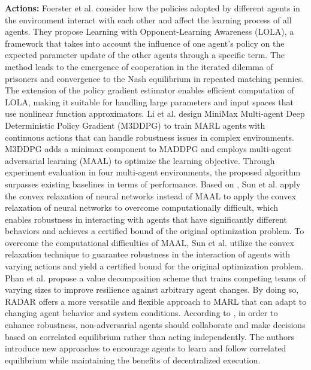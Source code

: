 \documentclass[acmsmall]{acmart}
\begin{document}
\textbf{Actions:} Foerster et al. \cite{foerster2017learning} consider how the policies adopted by different agents in the environment interact with each other and affect the learning process of all agents. They propose Learning with Opponent-Learning Awareness (LOLA), a framework that takes into account the influence of one agent's policy on the expected parameter update of the other agents through a specific term.
The method leads to the emergence of cooperation in the iterated dilemma of prisoners and convergence to the Nash equilibrium in repeated matching pennies. 
The extension of the policy gradient estimator enables efficient computation of LOLA, making it suitable for handling large parameters and input spaces that use nonlinear function approximators. 
Li et al. \cite{Li_Wu_Cui_Dong_Fang_Russell_2019} design MiniMax Multi-agent Deep Deterministic Policy Gradient (M3DDPG) to train MARL agents with continuous actions that can handle robustness issues in complex environments. M3DDPG  adds a minimax component to MADDPG \cite{maddpg} and employs multi-agent adversarial learning (MAAL) to optimize the learning objective. 
Through experiment evaluation in four multi-agent environments, the proposed algorithm surpasses existing baselines in terms of performance.
Based on \cite{Li_Wu_Cui_Dong_Fang_Russell_2019}, Sun et al. \cite{9812321} apply the convex relaxation of neural networks instead of MAAL to apply the convex relaxation of neural networks to overcome computationally difficult,  which enables robustness in interacting with agents that have significantly different behaviors and achieves a certified bound of the original optimization problem.
To overcome the computational difficulties of MAAL, Sun et al. \cite{9812321} utilize the convex relaxation technique to guarantee robustness in the interaction of agents with varying actions and yield a certified bound for the original optimization problem.
Phan et al. \cite{Phan_Belzner_Gabor_Sedlmeier_Ritz_Linnhoff-Popien_2021} propose a value decomposition scheme that trains competing teams of varying sizes to improve resilience against arbitrary agent changes. By doing so, RADAR offers a more versatile and flexible approach to MARL that can adapt to changing agent behavior and system conditions. 
According to \cite{hu2021robust}, in order to enhance robustness, non-adversarial agents should collaborate and make decisions based on correlated equilibrium rather than acting independently. The authors introduce new approaches to encourage agents to learn and follow correlated equilibrium while maintaining the benefits of decentralized execution.
\end{document}
